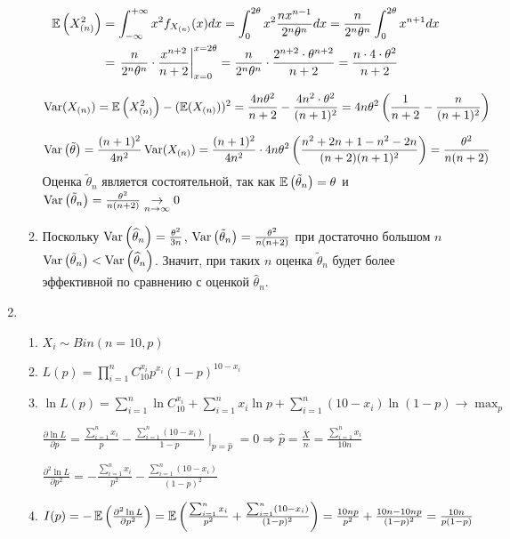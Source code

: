 \begin{enumerate}
\begin{enumerate}
\begin{align*}
\operatorname{\mathbb{E}}\left(X_{(n)}^2\right) &= \int_{-\infty}^{+\infty} x^2 f_{X_{(n)}} (x) dx = \int_{0}^{2\theta} x^2 \frac{nx^{n-1}}{2^n \theta^n}  dx = \frac{n}{2^n \theta^n}  \int_{0}^{2\theta} x^{n+1} dx \\
&= \left. \frac{n}{2^n \theta^n} \cdot \frac{x^{n+2}}{n+2} \right|_{x=0}^{x=2\theta} = \frac{n}{2^n \theta^n} \cdot  \frac{2^{n+2}\cdot \theta^{n+2}}{n+2} = \frac{n\cdot4\cdot\theta^2}{n+2}
\end{align*}

\[
\operatorname{Var}(X_{(n)}) = \operatorname{\mathbb{E}}\left(X_{(n)}^2\right)  - (\operatorname{\mathbb{E}}(X_{(n)}))^2 = \frac{4n\theta^2}{n+2} - \frac{4 n^2 \cdot \theta^2}{(n+1)^2} = 4n\theta^2 \left(\frac{1}{n+2} - \frac{n}{(n+1)^2}\right)
\]

\[
\operatorname{Var}\left(\tilde{\theta}\right) = \frac{(n+1)^2}{4n^2} \operatorname{Var}(X_{(n)}) = \frac{(n+1)^2}{4n^2}  \cdot 4n\theta^2 \left(\frac{n^2+2n+1 - n^2-2n}{(n+2)(n+1)^2} \right) = \frac{\theta^2}{n(n+2)}
\]
Оценка $\tilde{\theta}_n$ является состоятельной, так как
$\operatorname{\mathbb{E}}\left(\tilde{\theta}_n\right) = \theta$ и
$\operatorname{Var}\left(\tilde{\theta}_n\right) = \frac{\theta^2}{n(n+2)} \underset{n \to \infty}{\to} 0$
\item  Поскольку $\operatorname{Var}\left(\widehat{\theta}_n\right) = \frac{\theta^2}{3n}$,
$\operatorname{Var}\left(\tilde{\theta}_n\right) = \frac{\theta^2}{n(n+2)}$ при достаточно большом $n$
$\operatorname{Var}\left(\tilde{\theta}_n\right) < \operatorname{Var}\left(\widehat{\theta}_n\right)$.
Значит, при таких $n$ оценка $\tilde{\theta}_n$ будет более эффективной по сравнению
с оценкой $\widehat{\theta}_n$.
\end{enumerate}

\item
\begin{enumerate}
\item $X_i \sim Bin (n=10, p)$
\item $L(p)  = \prod_{i=1}^{n} C_{10}^{x_i} p^{x_i} (1-p)^{10-x_i}$
\item $\ln L(p) = \sum_{i=1}^{n} \ln C_{10}^{x_i} + \sum_{i=1}^n x_i \ln p + \sum_{i=1}^{n} (10-x_i)\ln (1-p) \to \max_p$

$\frac{\partial \ln L}{\partial p} = \frac{\sum_{i=1}^n x_i}{p} - \frac{\sum_{i=1}^{n} (10-x_i)}{1-p} \mid_{p=\hat{p}} = 0 \Rightarrow \hat{p} = \frac{\bar{X}}{n} = \frac{\sum_{i=1}^{n} x_i}{10n}$

$\frac{\partial^2 \ln L}{\partial p^2} = -\frac{\sum_{i=1}^n x_i}{p^2} -  \frac{\sum_{i=1}^{n} (10-x_i)}{(1-p)^2}$

\item $I(p) = -\operatorname{\mathbb{E}} \left(\frac{\partial^2 \ln L}{\partial p^2}  \right) = \operatorname{\mathbb{E}} \left(\frac{\sum_{i=1}^n x_i}{p^2} + \frac{\sum_{i=1}^{n} (10-x_i)}{(1-p)^2}\right) = \frac{10np}{p^2} + \frac{10n - 10np}{(1-p)^2} = \frac{10n}{p(1-p)}$


\end{enumerate}
\end{enumerate}

